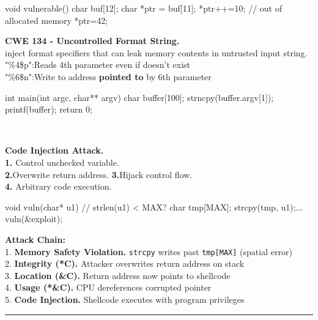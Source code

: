 \documentclass[9pt, a4paper]{extarticle}
\makeatletter
\renewcommand{\hline}{\noalign{\vskip 2px}\hrule\@height\arrayrulewidth\@width\linewidth\noalign{\vskip 2px}}
\makeatother
\begin{document}
\begin{minipage}[t]{0.495\textwidth}
\begin{minipage}[t]{0.39\textwidth}
		\begin{cc}
			void vulnerable(){
					char buf[12];
					char *ptr = buf[11];
					*ptr++=10;
					// out of allocated memory
					*ptr=42;}
		\end{cc}
	\end{minipage}\hfill
	\begin{minipage}[t]{0.59\textwidth}
		\textbf{CWE 134 - Uncontrolled Format String.} \\inject format specifiers that can leak memory contents in untrusted input string.\\
		"\%4\$p":Reads 4th parameter even if doesn't exist\\
		"\%6\$n":Write to address \textbf{pointed to} by 6th parameter
		\begin{cc}
			int main(int argc, char** argv){
					char buffer[100];
					strncpy(buffer.argv[1]);
					printf(buffer);
					return 0;}
		\end{cc}
	\end{minipage}\\[-5px]
	\begin{minipage}[t]{0.49\textwidth}
		\scriptsize
		\textbf{Code Injection Attack.} \\
		\textbf{1.} Control unchecked variable. \\
		\textbf{2.}Overwrite return address. \textbf{3.}Hijack control flow.\\
		\textbf{4.} Arbitrary code execution.
		\begin{cc}
			void vuln(char* u1){
					// strlen(u1) < MAX?
					char tmp[MAX];
					strcpy(tmp, u1);...
				} vuln(&exploit);
		\end{cc}
	\end{minipage}
	\begin{minipage}[t]{0.49\textwidth}
		\scriptsize
		\textbf{Attack Chain:}\\
		1. \textbf{Memory Safety Violation.} \texttt{strcpy} writes past \texttt{tmp[MAX]} (spatial error)\\
		2. \textbf{Integrity (*C).} Attacker overwrites return address on stack\\
		3. \textbf{Location (\&C).} Return address now points to shellcode\\
		4. \textbf{Usage (*\&C).} CPU dereferences corrupted pointer\\
		5. \textbf{Code Injection.} Shellcode executes with program privileges
	\end{minipage}
	\hline
	\begin{minipage}[htp]{0.49\textwidth}

\end{minipage}
\end{minipage}
\end{document}
